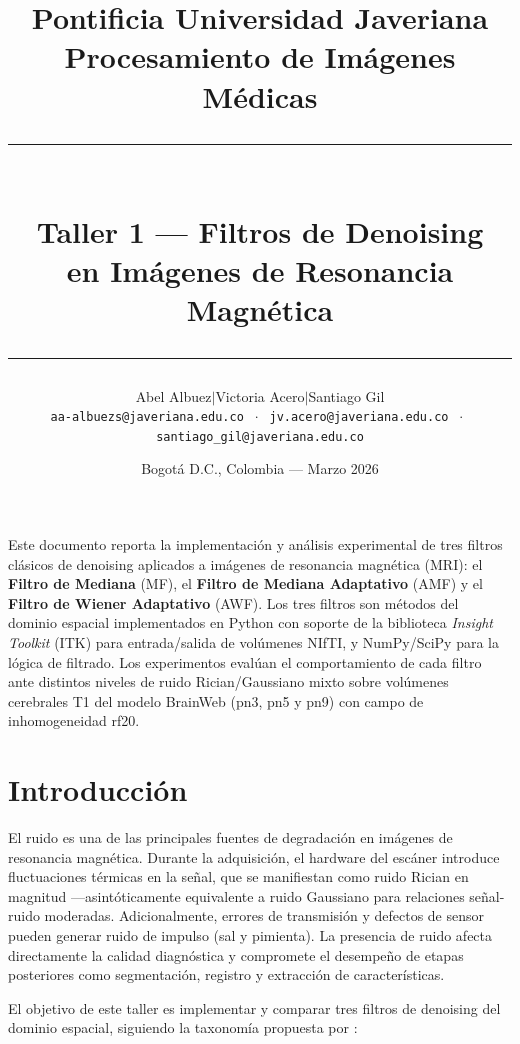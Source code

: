 \documentclass[12pt, a4paper]{article}
\title{
  \vspace{-1cm}
  {\large Pontificia Universidad Javeriana}\\[0.3em]
  {\large Procesamiento de Imágenes Médicas}\\[1em]
  \rule{\linewidth}{1.5pt}\\[0.5em]
  {\LARGE\bfseries Taller 1 — Filtros de Denoising\\[0.2em]
   en Imágenes de Resonancia Magnética}\\[0.3em]
  \rule{\linewidth}{1.5pt}
}
\author{
  Abel Albuez\quad$\mid$\quad Victoria Acero\quad$\mid$\quad Santiago Gil\\[0.4em]
  \small\texttt{aa-albuezs@javeriana.edu.co}
  $\;\cdot\;$
  \texttt{jv.acero@javeriana.edu.co}
  $\;\cdot\;$
  \texttt{santiago\_gil@javeriana.edu.co}
}
\date{Bogotá D.C., Colombia — Marzo 2026}
\begin{document}

\maketitle
\thispagestyle{fancy}

\begin{tcolorbox}[infostyle, title={Resumen}]
Este documento reporta la implementación y análisis experimental de tres filtros clásicos
de denoising aplicados a imágenes de resonancia magnética (MRI): el \textbf{Filtro de
Mediana} (MF), el \textbf{Filtro de Mediana Adaptativo} (AMF) y el \textbf{Filtro de
Wiener Adaptativo} (AWF). Los tres filtros son métodos del dominio espacial implementados
en Python con soporte de la biblioteca \emph{Insight Toolkit} (ITK) para entrada/salida
de volúmenes NIfTI, y NumPy/SciPy para la lógica de filtrado. Los experimentos evalúan
el comportamiento de cada filtro ante distintos niveles de ruido Rician/Gaussiano mixto
sobre volúmenes cerebrales T1 del modelo BrainWeb (pn3, pn5 y pn9) con campo de
inhomogeneidad rf20.
\end{tcolorbox}

\vspace{0.5em}
\tableofcontents
\newpage

\section{Introducción}

El ruido es una de las principales fuentes de degradación en imágenes de resonancia
magnética. Durante la adquisición, el hardware del escáner introduce fluctuaciones
térmicas en la señal, que se manifiestan como ruido Rician en magnitud —asintóticamente
equivalente a ruido Gaussiano para relaciones señal-ruido moderadas. Adicionalmente,
errores de transmisión y defectos de sensor pueden generar ruido de impulso (sal y
pimienta). La presencia de ruido afecta directamente la calidad diagnóstica y compromete
el desempeño de etapas posteriores como segmentación, registro y extracción de
características.

El objetivo de este taller es implementar y comparar tres filtros de denoising del dominio
espacial, siguiendo la taxonomía propuesta por \cite{ali2018}:
\end{document}
